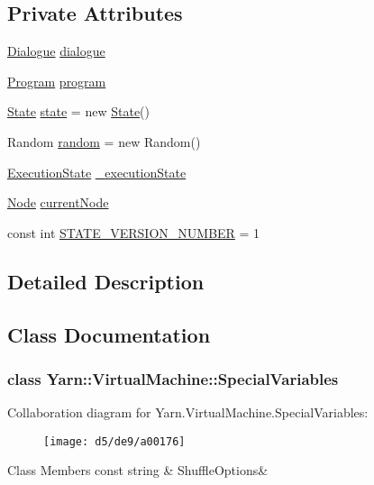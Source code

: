 \subsection*{Private Attributes}
\begin{DoxyCompactItemize}
\item 
\hyperlink{a00036}{Dialogue} \hyperlink{a00072_ac506426c503da5f033247c29e11c5e82}{dialogue}
\item 
\hyperlink{a00067}{Program} \hyperlink{a00072_a2695dbfe3d9df7ffa3f13ad2231217fb}{program}
\item 
\hyperlink{a00075}{State} \hyperlink{a00072_a70f2ce6201cdd2430ceaa764ac614ca0}{state} = new \hyperlink{a00075}{State}()
\item 
Random \hyperlink{a00072_a408485a00c7cc558428c86ed9dd04fca}{random} = new Random()
\item 
\hyperlink{a00072_add28fa9c8a45ca579e84d05920bbc42d}{Execution\-State} \hyperlink{a00072_a0ae362616d85f028b7ec3230388926f4}{\-\_\-execution\-State}
\item 
\hyperlink{a00026_dd/dae/a00163}{Node} \hyperlink{a00072_ab7594e14981ad75cecea3b2e7dcf895c}{current\-Node}
\item 
const int \hyperlink{a00072_ae84c732dc75a64589808e1e0fad1a85f}{S\-T\-A\-T\-E\-\_\-\-V\-E\-R\-S\-I\-O\-N\-\_\-\-N\-U\-M\-B\-E\-R} = 1
\end{DoxyCompactItemize}


\subsection{Detailed Description}


\subsection{Class Documentation}
\label{d0/d48/a00165}
\hypertarget{a00072_d0/d48/a00165}{}
\subsubsection{class Yarn\-:\-:Virtual\-Machine\-:\-:Special\-Variables}


Collaboration diagram for Yarn.\-Virtual\-Machine.\-Special\-Variables\-:
\nopagebreak
\begin{figure}[H]
\begin{center}
\leavevmode
\texttt{[image: d5/de9/a00176]}
\end{center}
\end{figure}
\begin{DoxyFields}{Class Members}
\hypertarget{a00072_aecbb8ab9becd96457d836100b2818078}{const string}\label{a00072_aecbb8ab9becd96457d836100b2818078}
&
Shuffle\-Options&
\\
\hline

\end{DoxyFields}


